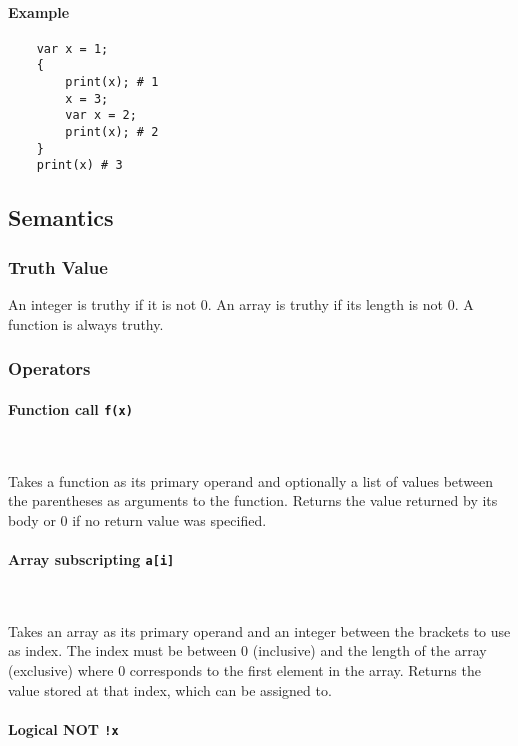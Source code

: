 \paragraph{Example}

\begin{verbatim}
    var x = 1;
    {
        print(x); # 1
        x = 3;
        var x = 2;
        print(x); # 2
    }
    print(x) # 3
\end{verbatim}

\subsection{Semantics}

\subsubsection{Truth Value}

An integer is truthy if it is not 0. An array is truthy if its length is not 0. A function is always truthy.

\subsubsection{Operators}

\paragraph{Function call \quad \texttt{f(x)}} \

Takes a function as its primary operand and optionally a list of values between the parentheses as arguments to the function. Returns the value returned by its body or 0 if no return value was specified.

\paragraph{Array subscripting \quad \texttt{a[i]}} \

Takes an array as its primary operand and an integer between the brackets to use as index. The index must be between 0 (inclusive) and the length of the array (exclusive) where 0 corresponds to the first element in the array. Returns the value stored at that index, which can be assigned to.

\paragraph{Logical NOT \quad \texttt{!x}} \

